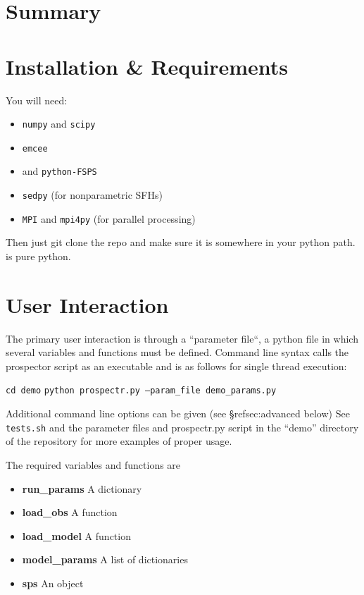 

\section{Summary}

\section{Installation \& Requirements}
You will need:

\begin{itemize}
\item \texttt{numpy} and \texttt{scipy}
\item \texttt{emcee}
\item {} and \texttt{python-FSPS}
\item \texttt{sedpy} (for nonparametric SFHs)
\item \texttt{MPI} and \texttt{mpi4py} (for parallel processing)
\end{itemize}

Then just git clone the repo and make sure it is somewhere in your
python path.  \prospector is pure python.

\section{User Interaction}
The primary user interaction is through a ``parameter file``, a python
file in which several variables and functions must be defined. Command
line syntax calls the prospector script as an executable and is as
follows for single thread execution:
\begin{center}
\texttt{cd demo}
\texttt{python prospectr.py --param_file demo_params.py}
\end{center}
Additional command line options can be given (see \S ref{sec:advanced}
below) See \texttt{tests.sh} and the parameter files and prospectr.py
script in the ``demo'' directory of the repository for more examples
of proper usage.

The required variables and functions are 
\begin{itemize}
\item {\bf run_params} A dictionary
\item {\bf load_obs} A function
\item {\bf load_model} A function
\item {\bf model_params} A list of dictionaries
\item {\bf sps} An object
\end{itemize}


